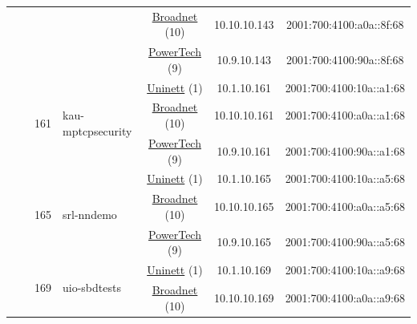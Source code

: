 \begin{small}
\begin{center}
\begin{longtable}{|c|c|c|c|c|c|c|c|}
  &  &  &  & \multicolumn{2}{|c|}{\tiny{\href{https://www.broadnet.no}{Broadnet} (10)}} & \tiny{10.10.10.143} & \tiny{2001:700:4100:a0a::8f:68} \\* \cline{5-5}\cline{6-6}\cline{7-7}\cline{8-8}
  &  &  &  & \multicolumn{2}{|c|}{\tiny{\href{http://www.powertech.no}{PowerTech} (9)}} & \tiny{10.9.10.143} & \tiny{2001:700:4100:90a::8f:68} \\* \cline{3-3}\cline{4-4}\cline{5-5}\cline{6-6}\cline{7-7}\cline{8-8}
  &  & \multirow{3}{*}{\tiny{161}} & \multicolumn{1}{|l|}{\multirow{3}{*}{\tiny{kau-mptcpsecurity}}} & \multicolumn{2}{|c|}{\tiny{\href{https://www.uninett.no}{Uninett} (1)}} & \tiny{10.1.10.161} & \tiny{2001:700:4100:10a::a1:68} \\* \cline{5-5}\cline{6-6}\cline{7-7}\cline{8-8}
  &  &  &  & \multicolumn{2}{|c|}{\tiny{\href{https://www.broadnet.no}{Broadnet} (10)}} & \tiny{10.10.10.161} & \tiny{2001:700:4100:a0a::a1:68} \\* \cline{5-5}\cline{6-6}\cline{7-7}\cline{8-8}
  &  &  &  & \multicolumn{2}{|c|}{\tiny{\href{http://www.powertech.no}{PowerTech} (9)}} & \tiny{10.9.10.161} & \tiny{2001:700:4100:90a::a1:68} \\* \cline{3-3}\cline{4-4}\cline{5-5}\cline{6-6}\cline{7-7}\cline{8-8}
  &  & \multirow{3}{*}{\tiny{165}} & \multicolumn{1}{|l|}{\multirow{3}{*}{\tiny{srl-nndemo}}} & \multicolumn{2}{|c|}{\tiny{\href{https://www.uninett.no}{Uninett} (1)}} & \tiny{10.1.10.165} & \tiny{2001:700:4100:10a::a5:68} \\* \cline{5-5}\cline{6-6}\cline{7-7}\cline{8-8}
  &  &  &  & \multicolumn{2}{|c|}{\tiny{\href{https://www.broadnet.no}{Broadnet} (10)}} & \tiny{10.10.10.165} & \tiny{2001:700:4100:a0a::a5:68} \\* \cline{5-5}\cline{6-6}\cline{7-7}\cline{8-8}
  &  &  &  & \multicolumn{2}{|c|}{\tiny{\href{http://www.powertech.no}{PowerTech} (9)}} & \tiny{10.9.10.165} & \tiny{2001:700:4100:90a::a5:68} \\* \cline{3-3}\cline{4-4}\cline{5-5}\cline{6-6}\cline{7-7}\cline{8-8}
  &  & \multirow{3}{*}{\tiny{169}} & \multicolumn{1}{|l|}{\multirow{3}{*}{\tiny{uio-sbdtests}}} & \multicolumn{2}{|c|}{\tiny{\href{https://www.uninett.no}{Uninett} (1)}} & \tiny{10.1.10.169} & \tiny{2001:700:4100:10a::a9:68} \\* \cline{5-5}\cline{6-6}\cline{7-7}\cline{8-8}
  &  &  &  & \multicolumn{2}{|c|}{\tiny{\href{https://www.broadnet.no}{Broadnet} (10)}} & \tiny{10.10.10.169} & \tiny{2001:700:4100:a0a::a9:68} \\* \cline{5-5}\cline{6-6}\cline{7-7}\cline{8-8}

\end{longtable}
\end{center}
\end{small}
